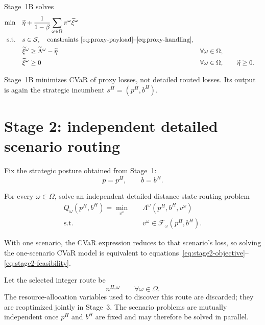 \documentclass[11pt]{article}
\begin{document}
Stage~1B solves
\begin{align}
\min\quad
&\widetilde\eta+
\frac{1}{1-\beta}
\sum_{\omega\in\Omega}\pi^\omega\widetilde\xi^\omega
\label{eq:proxy-cvar-objective}\\
\text{s.t.}\quad
&s\in\mathcal S,
\quad
\text{constraints~\eqref{eq:proxy-payload}--\eqref{eq:proxy-handling}},
\nonumber\\
&\widetilde\xi^\omega
\geq
\widetilde\Lambda^\omega-\widetilde\eta
&&\forall\omega\in\Omega,
\label{eq:proxy-cvar-excess}\\
&\widetilde\xi^\omega\geq0
&&\forall\omega\in\Omega,
\qquad\widetilde\eta\geq0.
\end{align}

Stage~1B minimizes CVaR of proxy losses, not detailed routed losses.  Its output
is again the strategic incumbent $s^H=(p^H,b^H)$.

\section{Stage 2: independent detailed scenario routing}

Fix the strategic posture obtained from Stage~1:
\begin{equation}
p=p^H,
\qquad
b=b^H.
\label{eq:stage2-fixing}
\end{equation}

For every $\omega\in\Omega$, solve an independent detailed distance-state
routing problem
\begin{align}
Q_\omega(p^H,b^H)
=
\min_{v^\omega}\quad
&\Lambda^\omega(p^H,b^H,v^\omega)
\label{eq:stage2-objective}\\
\text{s.t.}\quad
&v^\omega\in\mathcal F_\omega(p^H,b^H).
\label{eq:stage2-feasibility}
\end{align}

With one scenario, the CVaR expression reduces to that scenario's loss, so
solving the one-scenario CVaR model is equivalent to
equations~\eqref{eq:stage2-objective}--\eqref{eq:stage2-feasibility}.

Let the selected integer route be
\begin{equation}
n^{H,\omega}
\qquad\forall\omega\in\Omega.
\label{eq:stage2-routes}
\end{equation}
The resource-allocation variables used to discover this route are discarded;
they are reoptimized jointly in Stage~3.  The scenario problems are mutually
independent once $p^H$ and $b^H$ are fixed and may therefore be solved in
parallel.
\end{document}
